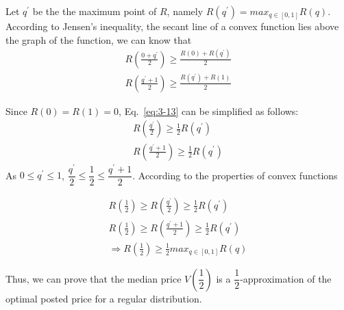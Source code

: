 \documentclass[oneside,solution]{seu-ml-assign}
\begin{document}
Let \(q^{'}\) be the the maximum point of \(R\), namely
\(R(q^{'})= max_{q\in[0,1]}R(q)\). According to Jensen's inequality, the
secant line of a convex function lies above the graph of the function,
we can know that
\begin{equation}
    \begin{aligned}
    R\left(\frac{0+q^{'}}{2}\right)\geq \frac{R(0)+R(q^{'})}{2}\\
R\left(\frac{q^{'}+1}{2}\right)\geq \frac{R(q^{'})+R(1)}{2}
    \end{aligned}
    \label{eq:3-13}
\end{equation}

Since \(R(0)=R(1)=0\), Eq.~\eqref{eq:3-13} can be simplified as
follows:
\begin{equation}
    \begin{aligned}
    R\left(\frac{q^{'}}{2}\right)\geq\frac{1}{2}R(q^{'})\\
    R\left(\frac{q^{'}+1}{2}\right)\geq \frac{1}{2}R(q^{'})
    \end{aligned}
\end{equation}
As \(0\leq q^{'}\leq1\),
\(\dfrac{q^{'}}{2}\leq \dfrac{1}{2}\leq \dfrac{q^{'}+1}{2}\). According
to the properties of convex functions

\begin{equation}
    \begin{aligned}
    R\left(\frac{1}{2}\right)\geq R\left(\frac{q^{'}}{2}\right)\geq\frac{1}{2}R(q^{'})\\
R\left(\frac{1}{2}\right)\geq R\left(\frac{q^{'}+1}{2}\right)\geq \frac{1}{2}R(q^{'})\\
\Rightarrow R\left(\frac{1}{2}\right)\geq \frac{1}{2}max_{q\in[0,1]}R(q)
    \end{aligned}
\end{equation}

Thus, we can prove that the median price \(V\left(\dfrac{1}{2}\right)\)
is a \(\dfrac{1}{2}\)-approximation of the optimal posted price for a
regular distribution.
\end{document}

